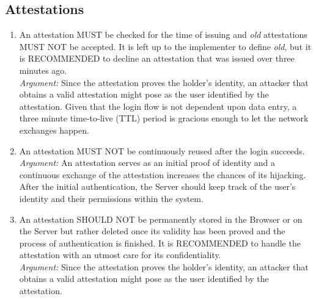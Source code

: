     \subsection{Attestations}
        \begin{enumerate}[resume]
                \item An attestation MUST be checked for the time of issuing and \textit{old} attestations MUST NOT be
                      accepted. It is left up to the implementer to define \textit{old}, but it is RECOMMENDED to
                      decline an attestation that was issued over three minutes ago.\\
                \textit{Argument:} Since the attestation proves the holder's identity, an attacker that obtains a valid
                                   attestation might pose as the user identified by the attestation. Given that the login
                                   flow is not dependent upon data entry, a three minute time-to-live  (TTL) period is 
                                   gracious enough to let the network exchanges happen.

                \item An attestation MUST NOT be continuously reused after the login succeeds.\\
                \textit{Argument:} An attestation serves as an initial proof of identity and a continuous exchange of the
                                   attestation increases the chances of its hijacking. After the initial authentication, the
                                   Server should keep track of the user's identity and their permissions within the system. 

                \item An attestation SHOULD NOT be permanently stored in the Browser or on the Server but rather deleted 
                      once its validity has been proved and the process of authentication is finished. It is RECOMMENDED 
                      to handle the attestation with an utmost care for its confidentiality.\\
                \textit{Argument:} Since the attestation proves the holder's identity, an attacker that obtains a valid
                                   attestation might pose as the user identified by the attestation.
        \end{enumerate}
    
